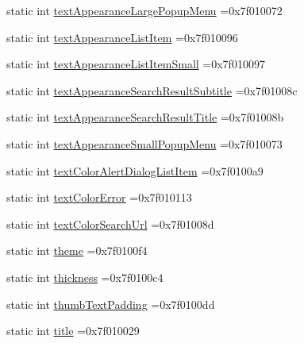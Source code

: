 \begin{DoxyCompactItemize}
\item 
static int \hyperlink{classandroid_1_1support_1_1v7_1_1recyclerview_1_1R_1_1attr_a052a916d3fb130310919b9f8974e8548}{text\+Appearance\+Large\+Popup\+Menu} =0x7f010072
\item 
static int \hyperlink{classandroid_1_1support_1_1v7_1_1recyclerview_1_1R_1_1attr_a4bd0c87392fa6a5baa7b155f1660b3b0}{text\+Appearance\+List\+Item} =0x7f010096
\item 
static int \hyperlink{classandroid_1_1support_1_1v7_1_1recyclerview_1_1R_1_1attr_ae2ee6a98639d060092e5eb0fe7e5af4c}{text\+Appearance\+List\+Item\+Small} =0x7f010097
\item 
static int \hyperlink{classandroid_1_1support_1_1v7_1_1recyclerview_1_1R_1_1attr_a468d1919ef9d21dffb680235646cd5ac}{text\+Appearance\+Search\+Result\+Subtitle} =0x7f01008c
\item 
static int \hyperlink{classandroid_1_1support_1_1v7_1_1recyclerview_1_1R_1_1attr_ae06ead368e03a644835f43cb7660d3cb}{text\+Appearance\+Search\+Result\+Title} =0x7f01008b
\item 
static int \hyperlink{classandroid_1_1support_1_1v7_1_1recyclerview_1_1R_1_1attr_a053f1e5eb304215bffc41b7246a53a2c}{text\+Appearance\+Small\+Popup\+Menu} =0x7f010073
\item 
static int \hyperlink{classandroid_1_1support_1_1v7_1_1recyclerview_1_1R_1_1attr_a707374c8710d8713e90c32a5844e25c7}{text\+Color\+Alert\+Dialog\+List\+Item} =0x7f0100a9
\item 
static int \hyperlink{classandroid_1_1support_1_1v7_1_1recyclerview_1_1R_1_1attr_a15f67c582296fda450cef82a5e1f28af}{text\+Color\+Error} =0x7f010113
\item 
static int \hyperlink{classandroid_1_1support_1_1v7_1_1recyclerview_1_1R_1_1attr_a9dbf4ebcddb38290ea5fee13c8abbada}{text\+Color\+Search\+Url} =0x7f01008d
\item 
static int \hyperlink{classandroid_1_1support_1_1v7_1_1recyclerview_1_1R_1_1attr_a70073a6df58348e63a41fb0c34126186}{theme} =0x7f0100f4
\item 
static int \hyperlink{classandroid_1_1support_1_1v7_1_1recyclerview_1_1R_1_1attr_a48cc98eb69804fa5cb50990c35a4f1bc}{thickness} =0x7f0100c4
\item 
static int \hyperlink{classandroid_1_1support_1_1v7_1_1recyclerview_1_1R_1_1attr_a4c07788a3b571a659f1fce1c9ac3cebd}{thumb\+Text\+Padding} =0x7f0100dd
\item 
static int \hyperlink{classandroid_1_1support_1_1v7_1_1recyclerview_1_1R_1_1attr_a47ca4afb37a36dfcdd28196efe1fe755}{title} =0x7f010029

\end{DoxyCompactItemize}
